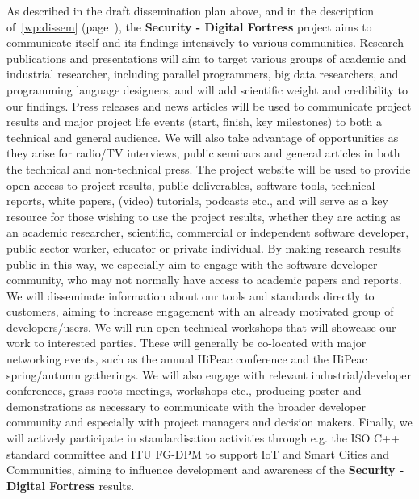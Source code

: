 \documentclass[a4paper,11pt]{article}
\newcommand{\project}[1]{\textbf{#1}\xspace}
\newcommand{\SECURITY}{\project{Security - Digital Fortress}}
\newcommand{\TheProject}{\SECURITY}
\begin{document}
As described in the draft dissemination plan above, and in the description of~\ref{wp:dissem} (page~\pageref{wp:dissem}),
the \TheProject{} project aims to communicate itself and its findings intensively to various communities.
Research publications and presentations will aim to target various groups of academic and industrial researcher,
including parallel programmers, big data researchers, and programming language
designers, and will add scientific weight and credibility to our findings.  Press releases and news articles will be used to communicate project results and major
project life events (start, finish, key milestones) to both a technical and general audience.
We will also take advantage of opportunities as they arise for radio/TV interviews, public seminars and general articles
in both the technical and non-technical press.
The project website will be used to provide open access to project results, public deliverables,
software tools, technical reports, white papers, (video) tutorials, podcasts etc., and will serve
as a key resource for those wishing to use the project results, whether they are acting as an academic researcher, scientific, commercial or independent
software developer, public sector worker,  educator or private individual.
By making research results public in this way, we especially aim to engage with the software developer
community, who may not normally have access to academic papers and reports.
We will disseminate information about our tools and standards directly to customers, aiming to
increase engagement with an already motivated group of developers/users.
We will run open technical workshops that will showcase our work to interested parties.
These will generally be co-located with major networking events, such as the annual HiPeac
conference and the HiPeac spring/autumn gatherings.
We will also engage with relevant industrial/developer conferences, grass-roots meetings, workshops etc.,
producing poster and demonstrations as necessary to communicate with the broader developer community
and especially with project managers and decision makers.
Finally, we will actively participate in standardisation activities through e.g. the ISO C++ standard committee and ITU FG-DPM to support IoT and Smart Cities and Communities,
aiming to influence development and awareness of the \TheProject{} results.

\clearpage

\end{document}
